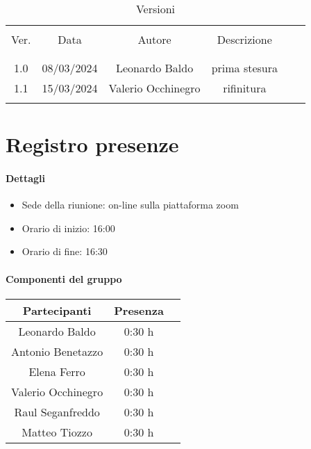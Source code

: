 \documentclass[italian,12pt]{article} %
\begin{document}


\newpage





\begin{table}[!h]
	\caption{Versioni}
	\begin{center}
		\begin{tabular}{ c c c c c c }
			\hline \\[-2ex]
			Ver. & Data & Autore & Descrizione \\
			\\[-2ex] \hline \\[-1.5ex]
			1.0 & 08/03/2024 & Leonardo Baldo& prima stesura \\
			1.1 & 15/03/2024 & Valerio Occhinegro& rifinitura  \\
			\\[-1.5ex] \hline
		\end{tabular}
	\end{center}
\end{table}
\newpage

\tableofcontents

\newpage

\section{Registro presenze}

\paragraph{Dettagli}

\begin{itemize}
	\item Sede della riunione: on-line sulla piattaforma zoom
	\item Orario di inizio: 16:00
	\item Orario di fine: 16:30
\end{itemize}

\paragraph{Componenti del gruppo}

\begin{flushleft}
\begin{table}[!h]
\begin{tabular}{ |c|c|c| } 
	\hline
	Partecipanti & Presenza \\
	\hline 
	Leonardo Baldo 		 & 0:30 h \\ 
	Antonio Benetazzo 	 & 0:30 h \\
	Elena Ferro 		 & 0:30 h \\
	Valerio Occhinegro 	 & 0:30 h \\
	Raul Seganfreddo 	 & 0:30 h \\
	Matteo Tiozzo 		 & 0:30 h \\ 
	\hline
\end{tabular}
\end{table}
\end{flushleft}
\end{document}
